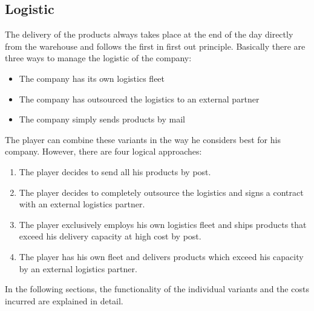 \subsection{Logistic} \label{logistic_simulation}

The delivery of the products always takes place at the end of the day directly from the warehouse and follows the first in first out principle. Basically there are three ways to manage the logistic of the company: 
\begin{itemize}
    \item The company has its own logistics fleet
    \item The company has outsourced the logistics to an external partner
    \item The company simply sends products by mail
\end{itemize}

The player can combine these variants in the way he considers best for his company. However, there are four logical approaches:
\begin{enumerate}
    \item The player decides to send all his products by post.
    \item The player decides to completely outsource the logistics and signs a contract with an external logistics partner.
    \item The player exclusively employs his own logistics fleet and ships products that exceed his delivery capacity at high cost by post.
    \item The player has his own fleet and delivers products which exceed his capacity by an external logistics partner.
\end{enumerate}
	
In the following sections, the functionality of the individual variants and the costs incurred are explained in detail.


